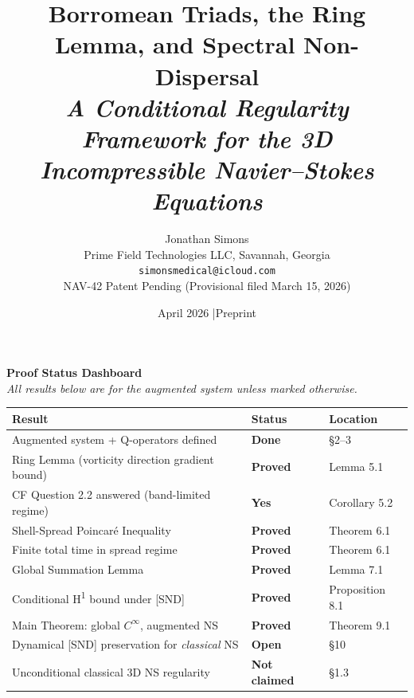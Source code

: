 \documentclass[11pt]{article}
\title{\textbf{Borromean Triads, the Ring Lemma, and Spectral Non-Dispersal}\\[6pt]
\large\textit{A Conditional Regularity Framework for the 3D Incompressible Navier--Stokes Equations}}
\author{Jonathan Simons\\
Prime Field Technologies LLC, Savannah, Georgia\\
\texttt{simonsmedical@icloud.com}\\[4pt]
{\small NAV-42 Patent Pending (Provisional filed March 15, 2026)}}
\date{April 2026 \quad|\quad Preprint}
\begin{document}
\maketitle

\begin{mdframed}[
  linecolor=darkblue,
  linewidth=1.5pt,
  backgroundcolor=white,
  innertopmargin=10pt,
  innerbottommargin=10pt,
  innerleftmargin=12pt,
  innerrightmargin=12pt
]
{\large\textbf{\color{darkblue} Proof Status Dashboard}}\\[6pt]
{\small\textit{All results below are for the augmented system unless marked otherwise.}}\\[8pt]

\begin{tabular}{>{\raggedright\arraybackslash}p{7.8cm} >{\centering\arraybackslash}p{2.5cm} >{\raggedright\arraybackslash}p{3.5cm}}
\toprule
\textbf{Result} & \textbf{Status} & \textbf{Location} \\
\midrule
\rowcolor{lightgreen}
Augmented system + Q-operators defined & \textcolor{proved}{\textbf{Done}} & \S2--3 \\
\rowcolor{lightgreen}
Ring Lemma (vorticity direction gradient bound) & \textcolor{proved}{\textbf{Proved}} & Lemma 5.1 \\
\rowcolor{lightgreen}
CF Question 2.2 answered (band-limited regime) & \textcolor{proved}{\textbf{Yes}} & Corollary 5.2 \\
\rowcolor{lightgreen}
Shell-Spread Poincar\'e Inequality & \textcolor{proved}{\textbf{Proved}} & Theorem 6.1 \\
\rowcolor{lightgreen}
Finite total time in spread regime & \textcolor{proved}{\textbf{Proved}} & Theorem 6.1 \\
\rowcolor{lightgreen}
Global Summation Lemma & \textcolor{proved}{\textbf{Proved}} & Lemma 7.1 \\
\rowcolor{lightgreen}
Conditional H\textsuperscript{1} bound under [SND] & \textcolor{proved}{\textbf{Proved}} & Proposition 8.1 \\
\rowcolor{lightgreen}
Main Theorem: global $C^\infty$, augmented NS & \textcolor{proved}{\textbf{Proved}} & Theorem 9.1 \\
\midrule
\rowcolor{lightred}
Dynamical [SND] preservation for \emph{classical} NS & \textcolor{open}{\textbf{Open}} & \S10 \\
\rowcolor{lightgray}
Unconditional classical 3D NS regularity & \textcolor{notclaimed}{\textbf{Not claimed}} & \S1.3 \\
\bottomrule
\end{tabular}


\end{mdframed}
\end{document}
